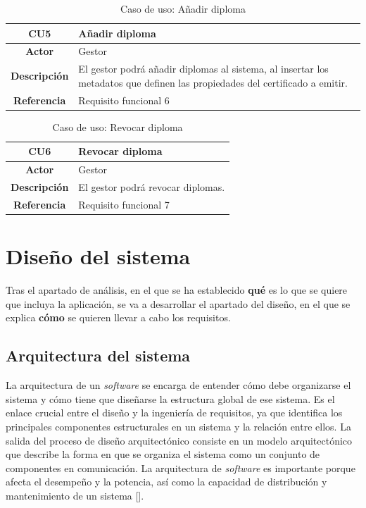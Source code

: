 \begin{table}[!h]
	\begin{center}
		\begin{tabular}{|c|p{10cm}|}
		\hline \textbf{CU5} & Añadir diploma \\ 
		\hline \textbf{Actor} & Gestor\\ 
		\hline \textbf{Descripción} & El gestor podrá añadir diplomas al sistema, al insertar los metadatos que definen las propiedades del certificado a emitir. \\ 
		\hline \textbf{Referencia} & Requisito funcional 6 \\ 
		\hline 
		\end{tabular}
		\caption{Caso de uso: Añadir diploma}
		\label{tab:CU5}
	\end{center}
\end{table}

\begin{table}[!h]
	\begin{center}
		\begin{tabular}{|c|p{10cm}|}
		\hline \textbf{CU6} & Revocar diploma \\ 
		\hline \textbf{Actor} & Gestor\\ 
		\hline \textbf{Descripción} & El gestor podrá revocar diplomas.\\ 
		\hline \textbf{Referencia} & Requisito funcional 7\\ 
		\hline 
		\end{tabular}
		\caption{Caso de uso: Revocar diploma}
		\label{tab:CU6}
	\end{center}
\end{table}

\section{Diseño del sistema}
Tras el apartado de análisis, en el que se ha establecido \textbf{qué} es lo que se quiere que incluya la aplicación, se va a desarrollar el apartado del diseño, en el que se explica \textbf{cómo} se quieren llevar a cabo los requisitos.

\subsection{Arquitectura del sistema}
La arquitectura de un \textit{software} se encarga de entender cómo debe organizarse el sistema y cómo tiene que diseñarse la estructura global de ese sistema. Es el enlace crucial entre el diseño y la ingeniería de requisitos, ya que identifica los principales componentes estructurales en un sistema y la relación entre ellos. La salida del proceso de diseño arquitectónico consiste en un modelo arquitectónico que describe la  forma en que se organiza el sistema como un conjunto de componentes en comunicación. La arquitectura de \textit{software} es importante porque afecta el desempeño y la potencia, así como la capacidad de distribución y mantenimiento de un sistema [\cite{91}].

